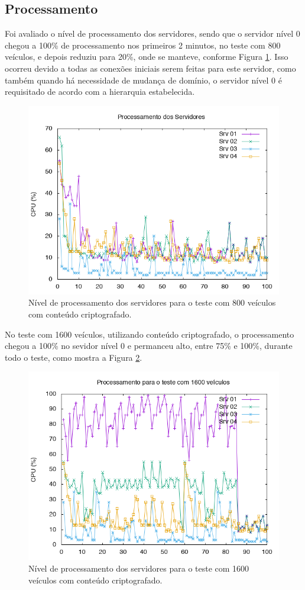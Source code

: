 \documentclass[
	12pt,				%
	oneside,			%
	a4paper,			%
	english,			%
	brazil				%
	]{abntex2ppgsi}
\begin{document}
\subsection{Processamento}

Foi avaliado o nível de processamento dos servidores, sendo que o servidor nível 0 chegou a 100\% de processamento nos primeiros 2 minutos, no teste com 800 veículos, e depois reduziu para 20\%, onde se manteve, conforme Figura  \ref{fig:processamento800}. Isso ocorreu devido a todas as conexões iniciais serem feitas para este servidor, como também quando há necessidade de mudança de domínio, o servidor nível 0 é requisitado de acordo com a hierarquia estabelecida. 

\begin{figure}[h!]
	\centering
	\includegraphics[width=0.7\columnwidth]{images/processamento1.png}
	\caption{Nível de processamento dos servidores para o teste com 800 veículos com conteúdo criptografado.}
	\label{fig:processamento800}
\end{figure}

No teste com 1600 veículos, utilizando conteúdo criptografado, o processamento chegou a 100\% no sevidor nível 0 e permanceu alto, entre 75\% e 100\%, durante todo o teste, como mostra a Figura \ref{fig:processamento1600}.

\begin{figure}[h!]
	\centering
	\includegraphics[width=0.7\columnwidth]{images/processamento2.png}
	\caption{Nível de processamento dos servidores para o teste com 1600 veículos com conteúdo criptografado.}
	\label{fig:processamento1600}
\end{figure}
\end{document}
